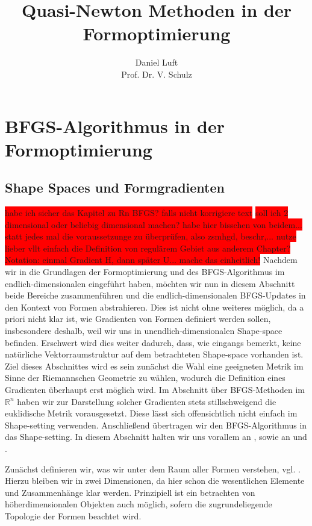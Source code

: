 \documentclass[bibliography=totoc,12pt,a4paper]{scrartcl}
\theoremstyle{exampstyle}
\numberwithin{equation}{section}
\begin{document}
\title{Quasi-Newton Methoden in der Formoptimierung}

\author{Daniel Luft \\ Prof. Dr. V. Schulz}

  \pagestyle{empty}

  \pagestyle{headings}
  

\section{BFGS-Algorithmus in der Formoptimierung}
\subsection{Shape Spaces und Formgradienten}
\colorbox{red}{habe ich sicher das Kapitel zu Rn BFGS? falls nicht korrigiere text}
\colorbox{red}{soll ich 2 dimensional oder beliebig dimensional machen? habe hier bisschen von beidem...}
\colorbox{red}{ statt jedes mal die voraussetzunge zu überprüfen, also zsmhgd, beschr,... nutze lieber vllt einfach die Definition von regulärem Gebiet aus anderem Chapter?}
\colorbox{red}{Notation: einmal Gradient H, dann später U... mache das einheitlich!}
Nachdem wir in die Grundlagen der Formoptimierung und des BFGS-Algorithmus im endlich-dimensionalen eingeführt haben, möchten wir nun in diesem Abschnitt beide Bereiche zusammenführen und die endlich-dimensionalen BFGS-Updates in den Kontext von Formen abstrahieren. Dies ist nicht ohne weiteres möglich, da a priori nicht klar ist, wie Gradienten von Formen definiert werden sollen, insbesondere deshalb, weil wir uns in unendlich-dimensionalen Shape-space befinden. Erschwert wird dies weiter dadurch, dass, wie eingangs bemerkt, keine natürliche Vektorraumstruktur auf dem betrachteten Shape-space vorhanden ist. Ziel dieses Abschnittes wird es sein zunächst die Wahl eine geeigneten Metrik im Sinne der Riemannschen Geometrie zu wählen, wodurch die Definition eines Gradienten überhaupt erst möglich wird. Im Abschnitt über BFGS-Methoden im $\mathbb{R}^n$ haben wir zur Darstellung solcher Gradienten stets stillschweigend die euklidische Metrik vorausgesetzt. Diese lässt sich offensichtlich nicht einfach im Shape-setting verwenden. Anschließend übertragen wir den BFGS-Algorithmus in das Shape-setting. In diesem Abschnitt halten wir uns vorallem an \cite{bfgs1}, sowie an \cite{shape_space} und \cite{bfgs2}.

Zunächst definieren wir, was wir unter dem Raum aller Formen verstehen, vgl. \cite{bfgs1}. Hierzu bleiben wir in zwei Dimensionen, da hier schon die wesentlichen Elemente und Zusammenhänge klar werden. Prinzipiell ist ein betrachten von höherdimensionalen Objekten auch möglich, sofern die zugrundeliegende Topologie der Formen beachtet wird.
\end{document}
